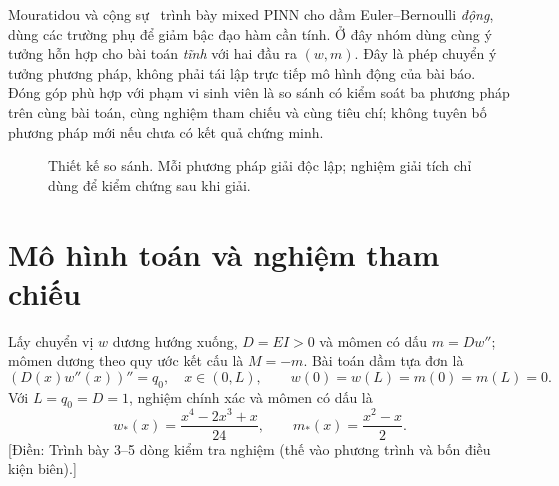 \documentclass[12pt,a4paper]{article}
\newcommand{\todo}[1]{\textcolor{red!70!black}{[Điền: #1]}}
\begin{document}
Mouratidou và cộng sự~\cite{Mouratidou2026} trình bày mixed PINN cho dầm Euler--Bernoulli \emph{động}, dùng các trường phụ để giảm bậc đạo hàm cần tính. Ở đây nhóm dùng cùng ý tưởng hỗn hợp cho bài toán \emph{tĩnh} với hai đầu ra $(w,m)$. Đây là phép chuyển ý tưởng phương pháp, không phải tái lập trực tiếp mô hình động của bài báo. Đóng góp phù hợp với phạm vi sinh viên là so sánh có kiểm soát ba phương pháp trên cùng bài toán, cùng nghiệm tham chiếu và cùng tiêu chí; không tuyên bố phương pháp mới nếu chưa có kết quả chứng minh.

\begin{figure}[ht]
\centering
{}
\caption{Thiết kế so sánh. Mỗi phương pháp giải độc lập; nghiệm giải tích chỉ dùng để kiểm chứng sau khi giải.}
\label{fig:workflow}
\end{figure}

\section{Mô hình toán và nghiệm tham chiếu}
Lấy chuyển vị $w$ dương hướng xuống, $D=EI>0$ và mômen có dấu $m=Dw''$; mômen dương theo quy ước kết cấu là $M=-m$. Bài toán dầm tựa đơn là
\begin{equation}\label{eq:beam}
  (D(x)w''(x))''=q_0,\quad x\in(0,L),\qquad
  w(0)=w(L)=m(0)=m(L)=0.
\end{equation}
Với $L=q_0=D=1$, nghiệm chính xác và mômen có dấu là
\begin{equation}\label{eq:exact}
  w_*(x)=\frac{x^4-2x^3+x}{24},\qquad
  m_*(x)=\frac{x^2-x}{2}.
\end{equation}
\todo{Trình bày 3--5 dòng kiểm tra nghiệm (thế vào phương trình và bốn điều kiện biên).}
\end{document}
